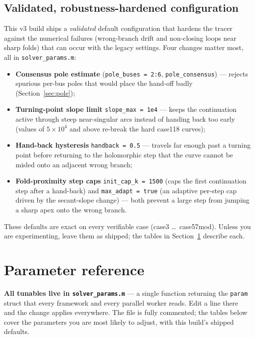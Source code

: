 \documentclass[11pt,a4paper]{article}
\newcommand{\code}[1]{\texttt{#1}}
\begin{document}
\subsection{Validated, robustness-hardened configuration}\label{sec:tuned}
This v3 build ships a \emph{validated} default configuration that hardens the tracer
against the numerical failures (wrong-branch drift and non-closing loops near sharp folds)
that can occur with the legacy settings. Four changes matter most, all in
\code{solver_params.m}:
\begin{itemize}[leftmargin=1.4em]
  \item \textbf{Consensus pole estimate} (\code{pole_buses = 2:6}, \code{pole_consensus})
        --- rejects spurious per-bus poles that would place the hand-off badly
        (Section~\ref{sec:pole});
  \item \textbf{Turning-point slope limit} \code{slope_max = 1e4} --- keeps the
        continuation active through steep near-singular arcs instead of handing back too
        early (values of $5\!\times\!10^4$ and above re-break the hard case118 curves);
  \item \textbf{Hand-back hysteresis} \code{handback = 0.5} --- travels far enough past a
        turning point before returning to the holomorphic step that the curve cannot be
        misled onto an adjacent wrong branch;
  \item \textbf{Fold-proximity step caps} \code{init_cap_k = 1500} (caps the first
        continuation step after a hand-back) and \code{max_adapt = true} (an adaptive
        per-step cap driven by the secant-slope change) --- both prevent a large step from
        jumping a sharp apex onto the wrong branch.
\end{itemize}
These defaults are exact on every verifiable case (case3 \dots\ case57mod). Unless you are
experimenting, leave them as shipped; the tables in Section~\ref{sec:params} describe each.

\section{Parameter reference}\label{sec:params}

\textbf{All tunables live in \code{solver_params.m}} --- a single function returning the
\code{param} struct that every framework and every parallel worker reads. Edit a line
there and the change applies everywhere. The file is fully commented; the tables below
cover the parameters you are most likely to adjust, with this build's shipped defaults.
\end{document}
